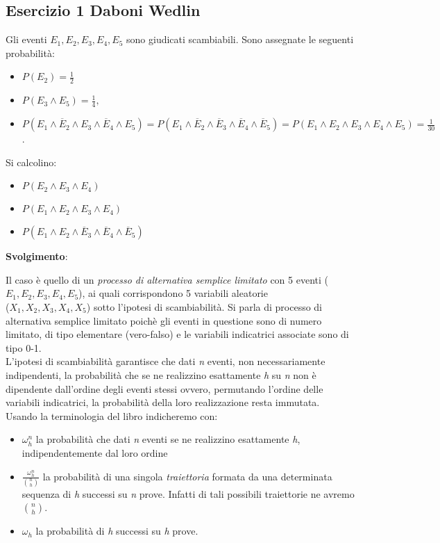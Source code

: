 \subsection{Esercizio 1 Daboni Wedlin}
Gli eventi $E_{1}, E_{2},  E_{3}, E_{4}, E_{5}$ sono giudicati scambiabili.
Sono assegnate le seguenti probabilità:
\begin{itemize}[label=]
	\item $P(E_{2})=\frac{1}{2}$
	\item $P(E_{3}\wedge E_{5})=\frac{1}{4},$ 
	\item $P(E_{1}\wedge\overline{E}_2\wedge E_{3}\wedge\overline{E}_{4}\wedge E_{5})=P(E_{1}\wedge\overline{E}_{2}\wedge\overline{E}_{3}\wedge\overline{E}_{4}\wedge\overline{E}_{5})=P(E_{1}\wedge E_{2}\wedge E_{3}\wedge E_{4}\wedge E_{5})=\frac{1}{30}$.
\end{itemize}

Si calcolino:
\begin{itemize}[label=]
	\item $P(E_{2}\wedge E_{3}\wedge E_{4})$
	\item $P(E_{1}\wedge E_{2}\wedge E_{3}\wedge E_{4})$
	\item $P(E_{1}\wedge E_{2}\wedge\overline{E}_{3}\wedge\overline{E}_{4}\wedge\overline{E}_{5})$
\end{itemize}

\textbf{Svolgimento}:
\\
\bigskip

Il caso è quello di un \textit{processo di alternativa semplice limitato} con 5 eventi ($E_{1}, E_{2},  E_{3}, E_{4}, E_{5}$), ai quali corrispondono 5 variabili aleatorie \\
($X_{1}, X_{2},  X_{3}, X_{4}, X_{5}$) sotto l’ipotesi di scambiabilità. 
Si parla di processo di alternativa semplice limitato poichè gli eventi in questione sono di numero limitato, di tipo elementare (vero-falso) e le variabili indicatrici associate sono di tipo 0-1. \\
L’ipotesi di scambiabilità garantisce che dati \textit{n} eventi, non necessariamente indipendenti, la probabilità che se ne realizzino esattamente \textit{h} su \textit{n} non è dipendente dall'ordine degli eventi stessi ovvero, permutando l’ordine delle variabili indicatrici, la probabilità della loro realizzazione resta immutata. \\

Usando la terminologia del libro indicheremo con:
\begin{itemize}[label=-]
    \item $\omega^n_h$ la probabilità che dati \textit{n} eventi se ne realizzino esattamente \textit{h}, indipendentemente dal loro ordine
     \item $\frac{\omega^n_h}{\binom{n}{h}}$ la probabilità di una singola \textit{traiettoria} formata da una determinata sequenza di \textit{h} successi su \textit{n} prove. Infatti di tali possibili traiettorie ne avremo $\binom{n}{h}$.
    \item $\omega_h$ la probabilità di \textit{h} successi su \textit{h} prove.
\end{itemize}


